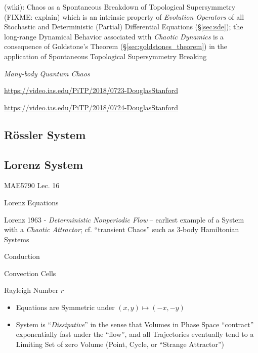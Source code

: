 (wiki): Chaos as a Spontaneous Breakdown of Topological Supersymmetry (FIXME:
explain) which is an intrinsic property of \emph{Evolution Operators} of all
Stochastic and Deterministic (Partial) Differential Equations (\S\ref{sec:sde});
the long-range Dynamical Behavior associated with \emph{Chaotic Dynamics} is a
consequence of Goldstone's Theorem (\S\ref{sec:goldstones_theorem}) in the
application of Spontaneous Topological Supersymmetry Breaking

\asterism


\emph{Many-body Quantum Chaos}

\url{https://video.ias.edu/PiTP/2018/0723-DouglasStanford}

\url{https://video.ias.edu/PiTP/2018/0724-DouglasStanford}



\subsection{R\"ossler System}\label{sec:rossler_system}

\subsection{Lorenz System}\label{sec:lorenz_system}

MAE5790 Lec. 16

Lorenz Equations

Lorenz 1963 - \emph{Deterministic Nonperiodic Flow} -- earliest example of a
System with a \emph{Chaotic Attractor}; cf. ``transient Chaos'' such as 3-body
Hamiltonian Systems

Conduction

Convection Cells

Rayleigh Number $r$

\begin{itemize}
  \item Equations are Symmetric under $(x,y) \mapsto (-x,-y)$
  \item System is ``\emph{Dissipative}'' in the sense that Volumes in Phase
    Space ``contract'' exponentially fast under the ``flow'', and all
    Trajectories eventually tend to a Limiting Set of zero Volume (Point, Cycle,
    or ``Strange Attractor'')
\end{itemize}

